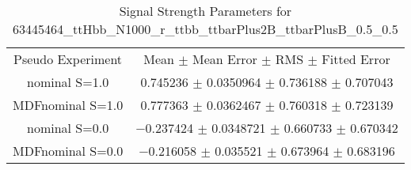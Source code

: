 \begin{table}
\centering
\caption{Signal Strength Parameters for 63445464\_ttHbb\_N1000\_r\_ttbb\_ttbarPlus2B\_ttbarPlusB\_0.5\_0.5}
\begin{tabular}{cc}
\toprule
Pseudo Experiment & Mean $\pm$ Mean Error $\pm$ RMS $\pm$ Fitted Error\\
nominal S=1.0 & \num{0.745236} $\pm$ \num{0.0350964} $\pm$ \num{0.736188} $\pm$ \num{0.707043}\\
MDFnominal S=1.0 & \num{0.777363} $\pm$ \num{0.0362467} $\pm$ \num{0.760318} $\pm$ \num{0.723139}\\
nominal S=0.0 & \num{-0.237424} $\pm$ \num{0.0348721} $\pm$ \num{0.660733} $\pm$ \num{0.670342}\\
MDFnominal S=0.0 & \num{-0.216058} $\pm$ \num{0.035521} $\pm$ \num{0.673964} $\pm$ \num{0.683196}\\
\bottomrule
\end{tabular}
\end{table}